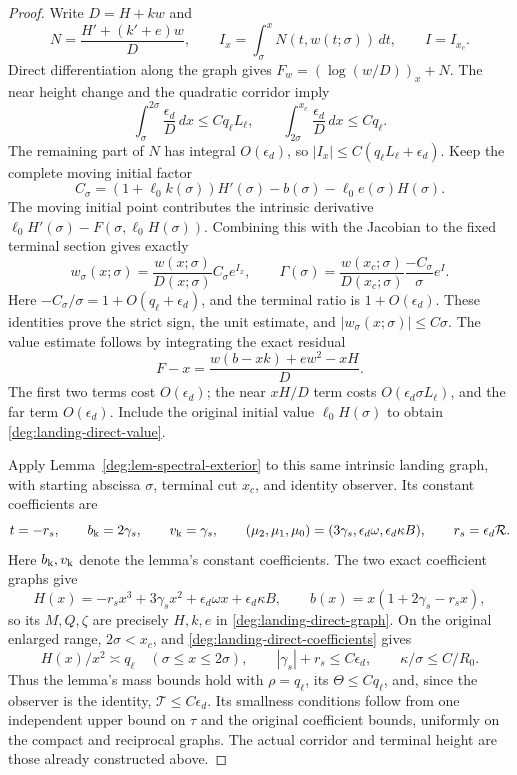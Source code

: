 \begin{proof}
Write \(D=H+kw\) and
\[
 N=\frac{H'+(k'+e)w}{D},\qquad
 I_x=\int_\sigma^xN(t,w(t;\sigma))\,dt,\qquad I=I_{x_c}.
\]
Direct differentiation along the graph gives
\(F_w=(\log(w/D))_x+N\).
The near height change and the quadratic corridor imply
\[
 \int_\sigma^{2\sigma}\frac{\epsilon_d}{D}\,dx
 \le Cq_\ell L_\ell,\qquad
 \int_{2\sigma}^{x_c}\frac{\epsilon_d}{D}\,dx\le Cq_\ell.
\]
The remaining part of \(N\) has integral \(O(\epsilon_d)\), so
\(|I_x|\le C(q_\ell L_\ell+\epsilon_d)\).
Keep the complete moving initial factor
\begin{equation}\label{deg:landing-direct-initial-factor}
 C_\sigma=(1+\ell_0k(\sigma))H'(\sigma)
                 -b(\sigma)-\ell_0e(\sigma)H(\sigma).
\end{equation}
The moving initial point contributes the intrinsic derivative
\(\ell_0H'(\sigma)-F(\sigma,\ell_0H(\sigma))\). Combining this
with the Jacobian to the fixed terminal section gives exactly
\begin{equation}\label{deg:landing-direct-exact-variation}
 w_\sigma(x;\sigma)=\frac{w(x;\sigma)}{D(x;\sigma)}C_\sigma e^{I_x},
 \qquad
 \Gamma(\sigma)=\frac{w(x_c;\sigma)}{D(x_c;\sigma)}
                       \frac{-C_\sigma}{\sigma}e^I .
\end{equation}
Here \(-C_\sigma/\sigma=1+O(q_\ell+\epsilon_d)\), and the terminal
ratio is \(1+O(\epsilon_d)\). These identities prove the strict sign,
the unit estimate, and \(|w_\sigma(x;\sigma)|\le C\sigma\).
The value estimate follows by integrating the exact residual
\[
 F-x=\frac{w(b-xk)+ew^2-xH}{D}.
\]
The first two terms cost \(O(\epsilon_d)\); the near \(xH/D\) term
costs \(O(\epsilon_d\sigma L_\ell)\), and the far term
\(O(\epsilon_d)\). Include the original initial value
\(\ell_0H(\sigma)\) to obtain \eqref{deg:landing-direct-value}.

Apply Lemma~\ref{deg:lem-spectral-exterior} to this same intrinsic
landing graph, with starting abscissa \(\sigma\), terminal cut \(x_c\),
and identity observer. Its constant coefficients are
\[
 t=-r_s,\qquad b_{\rm k}=2\gamma_s,\qquad v_{\rm k}=\gamma_s,
 \qquad
 (\mu_2,\mu_1,\mu_0)
   =(3\gamma_s,\epsilon_d\omega,\epsilon_d\kappa B),
 \qquad r_s=\epsilon_d\mathcal R .
\]
Here \(b_{\rm k},v_{\rm k}\) denote the lemma's constant coefficients.
The two exact coefficient graphs give
\[
 H(x)=-r_sx^3+3\gamma_sx^2+\epsilon_d\omega x
                         +\epsilon_d\kappa B,
 \qquad b(x)=x(1+2\gamma_s-r_sx),
\]
so its \(M,Q,\zeta\) are precisely \(H,k,e\) in
\eqref{deg:landing-direct-graph}. On the original enlarged range,
\(2\sigma<x_c\), and \eqref{deg:landing-direct-coefficients} gives
\[
 H(x)/x^2\asymp q_\ell\quad(\sigma\le x\le2\sigma),\qquad
 |\gamma_s|+r_s\le C\epsilon_d,\qquad
 \kappa/\sigma\le C/R_0 .
\]
Thus the lemma's mass bounds hold with \(\rho=q_\ell\), its
\(\Theta\le Cq_\ell\), and, since the observer is the identity,
\(\mathcal T\le C\epsilon_d\). Its smallness conditions follow from
one independent upper bound on \(\tau\) and the original coefficient
bounds, uniformly on the compact and reciprocal graphs. The actual
corridor and terminal height are those already constructed above.


\end{proof}
